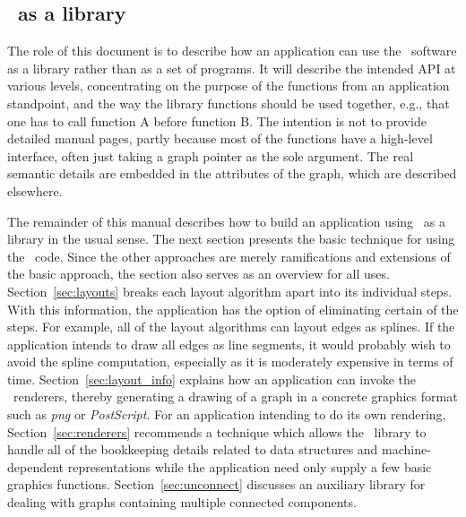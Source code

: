 \subsection{\gviz\ as a library}
The role of this document is to describe how an application can use the
\gviz\ software as a library rather than as a set of programs. It will
describe the intended API at various levels, concentrating on the purpose
of the functions from an application standpoint, and the way the 
library functions should be used together, e.g., that one has to call
function A before function B. The intention is not to provide
detailed manual pages, partly because most of the functions have a high-level 
interface, often just taking a graph pointer as the sole argument.
The real semantic details are embedded in the
attributes of the graph, which are described elsewhere. 

The remainder of this manual describes how to build an application
using \gviz\ as a library in the usual sense.
The next section presents the basic technique for using the \gviz\ code. Since
the other approaches are merely ramifications and extensions of the
basic approach, the section also serves as an overview for all uses.
Section~\ref{sec:layouts} breaks each layout algorithm apart into 
its individual steps.
With this information, the application has the option of eliminating
certain of the steps. For example, all of the layout algorithms can 
layout edges as splines. If the application intends to draw all edges
as line segments, it would probably wish to avoid the spline computation,
especially as it is moderately expensive in terms of time. 
Section~\ref{sec:layout_info} explains how an application can invoke the
\gviz\ renderers, thereby generating a drawing of a graph in 
a concrete graphics format such as {\em png} or {\em PostScript}.
For an application intending to do its own rendering,
Section~\ref{sec:renderers} recommends a technique which allows the
\gviz\ library to handle all of the bookkeeping details related to
data structures and machine-dependent representations while the
application need only supply a few basic graphics functions.
Section~\ref{sec:unconnect}
discusses an auxiliary library for dealing with graphs containing
multiple connected components.

